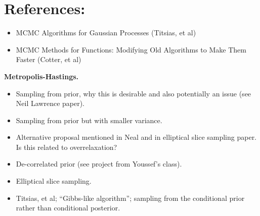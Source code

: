 \documentclass[12pt]{article}
\begin{document}
\section{References:}
\begin{itemize}
\item MCMC Algorithms for Gaussian Processes (Titsias, et al)
\item MCMC Methods for Functions: Modifying Old Algorithms to Make Them Faster (Cotter, et al)
\end{itemize}

\bigskip
\noindent
\textbf{Metropolis-Hastings.}
\begin{itemize}
\item Sampling from prior, why this is desirable and also potentially an issue (see Neil Lawrence paper).
\item Sampling from prior but with smaller variance. 
\item Alternative proposal mentioned in Neal and in elliptical slice sampling paper. Is this related to overrelaxation? 
\item De-correlated prior (see project from Youssef's class). 
\item Elliptical slice sampling. 
\item Titsias, et al; ``Gibbs-like algorithm''; sampling from the conditional prior rather than conditional posterior. 
\end{itemize}
\end{document}
